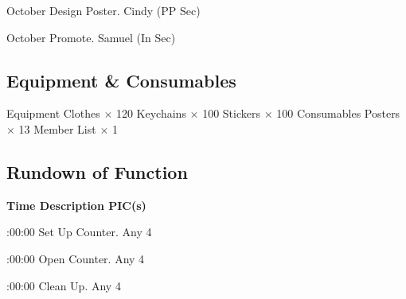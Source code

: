 \bTR{}
\eTD{} October
\eTD\bTD Design Poster.
\eTD\bTD Cindy (PP Sec)
\eTD\eTR

\bTR{}
\eTD{} October
\eTD\bTD Promote.
\eTD\bTD Samuel (In Sec)
\eTD\eTR

\eTABLEbody
\eTABLE

\pagebreak
\subsection{Equipment \& Consumables}
\starttabulate[|l|l|]
\NC{}Equipment\NC\NR
\HL
\NC Clothes \NC $\times$ 120 \NR
\NC Keychains \NC $\times$ 100 \NR
\NC Stickers \NC $\times$ 100 \NR
\HL
\NR
\NC{}Consumables\NC\NR
\HL
\NC Posters \NC $\times$ 13 \NR
\NC Member List \NC $\times$ 1 \NR
\HL
\stoptabulate


\subsection{Rundown of Function}

\setupTABLE[c][1][width=1.25in]
\setupTABLE[c][2][width=3.5in]
\setupTABLE[c][3][width=1.25in]
\bTABLE
\bTABLEhead

\bTR\bTH    \bf{Time}
\eTH\bTH    \bf{Description}
\eTH\bTH    \bf{PIC(s)}
\eTH\eTR

\eTABLEhead
\bTABLEbody

\bTR{}:00:00
\eTD\bTD Set Up Counter.
\eTD\bTD Any 4
\eTD\eTR

\bTR{}:00:00
\eTD\bTD Open Counter.
\eTD\bTD Any 4
\eTD\eTR

\bTR{}:00:00
\eTD\bTD Clean Up.
\eTD\bTD Any 4
\eTD\eTR

\eTABLEbody
\eTABLE

\stopsection
\pagebreak
